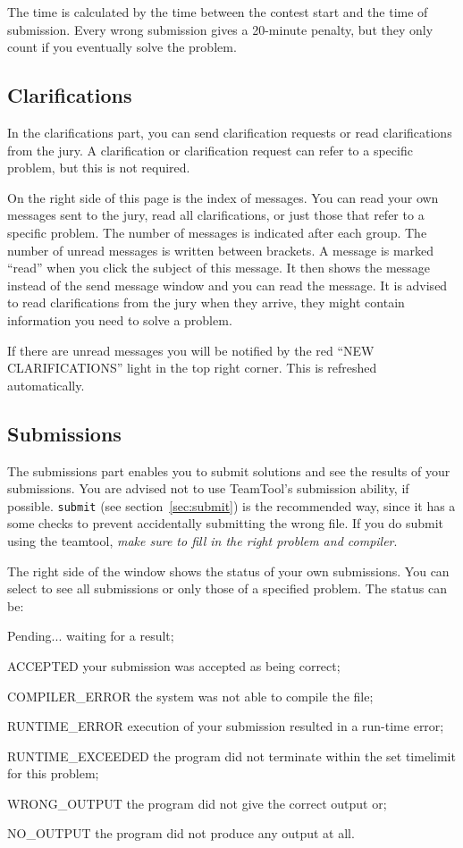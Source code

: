 \documentclass[a4paper]{artikel3}
\newcommand{\cmd}[1]{\texttt{#1}}
\newenvironment{ddlist}[1]%
  {\begin{list}{}{\settowidth{\labelwidth}{\textbf{#1}}
   \setlength{\leftmargin}{\labelwidth}
   \addtolength{\leftmargin}{\labelsep}
   \renewcommand{\makelabel}[1]{\textbf{\hfill##1}}}}%
  {\end{list}}
\begin{document}
The time is calculated by the time between the contest start and the time of
submission. Every wrong submission gives a 20-minute penalty, but they
only count if you eventually solve the problem.

\subsection{Clarifications}

In the clarifications part, you can send clarification requests or read
clarifications from the jury. A clarification or clarification request can
refer to a specific problem, but this is not required.

On the right side of this page is the index of messages. You can read your own
messages sent to the jury, read all clarifications, or just those that refer
to a specific problem. The number of messages is indicated after each group.
The number of unread messages is written between brackets. A message is
marked ``read'' when you click the subject of this message. It then shows
the message instead of the send message window and you can read the message.
It is advised to read clarifications from the jury when they arrive, they
might contain information you need to solve a problem.

If there are unread messages you will be notified by the red ``NEW
CLARIFICATIONS'' light in the top right corner. This is refreshed automatically.

\subsection{Submissions}

The submissions part enables you to submit solutions and see the results of
your submissions. You are advised not to use TeamTool's submission ability,
if possible. \cmd{submit} (see section~\ref{sec:submit}) is the recommended
way, since it has a some checks to prevent accidentally submitting the
wrong file. If you do submit using the teamtool, \emph{make sure to fill in
the right problem and compiler}.

The right side of the window shows the status of your own submissions. You
can select to see all submissions or only those of a specified problem. The
status can be:

\begin{ddlist}{XRUNTIMEXEXCEEDED}
\item[Pending...] waiting for a result;
\item[ACCEPTED] your submission was accepted as being correct;
\item[COMPILER\_ERROR] the system was not able to compile the file;
\item[RUNTIME\_ERROR] execution of your submission resulted in a run-time
error;
\item[RUNTIME\_EXCEEDED] the program did not terminate within the set
timelimit for this problem;
\item[WRONG\_OUTPUT] the program did not give the correct output or;
\item[NO\_OUTPUT] the program did not produce any output at all.
\end{ddlist}
\end{document}
